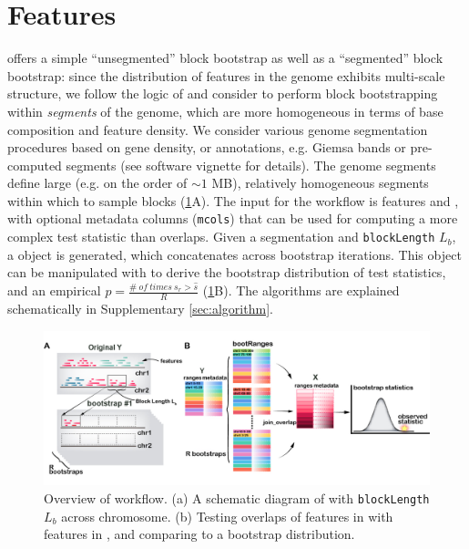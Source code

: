 \vspace*{-20pt}

\section{Features}

\bootranges offers a simple ``unsegmented'' block bootstrap as well as
a ``segmented'' block bootstrap:
since the distribution of features in the genome exhibits multi-scale
structure, we follow the logic of \citet{bickel2010subsampling} and consider to
perform block bootstrapping within \textit{segments} of the genome, which are
more homogeneous in terms of base composition and feature density.
We consider various genome segmentation procedures based on gene
density, or annotations, e.g. Giemsa bands or pre-computed segments
(see software vignette for details).
The genome segments define large (e.g. on the order of ${\sim}1$ MB),
relatively homogeneous segments within which to sample blocks
(\cref{fig:framework}A). 
The input for the workflow is \granges features  and
, with optional metadata columns (\texttt{mcols}) that can be
used for computing a more complex test statistic than overlaps.
Given a segmentation and \texttt{blockLength} $L_b$, a \bootranges
object is generated, which concatenates \granges across bootstrap
iterations. This \bootranges object can be manipulated with \plyranges
to derive the bootstrap distribution of test statistics, and an
empirical $p = \frac{\#\ of\ times\ s_r >\hat{s}}{R}$ (\cref{fig:framework}B).
The \bootranges algorithms are explained schematically in Supplementary \cref{sec:algorithm}.

\vspace{-0.3cm}
\begin{figure}[htbp]
\centering%
\setlength{\abovecaptionskip}{-0.05cm}
\includegraphics[scale=0.65]{Figures/bootRanges.jpg}
\caption{Overview of \bootranges workflow. (a) A schematic
  diagram of \bootranges with \texttt{blockLength} $L_b$ across chromosome.
  (b) Testing overlaps of features in  with features in
  , and comparing to a bootstrap distribution.} 
\label{fig:framework}
\vspace{-0.5cm}
\end{figure}

